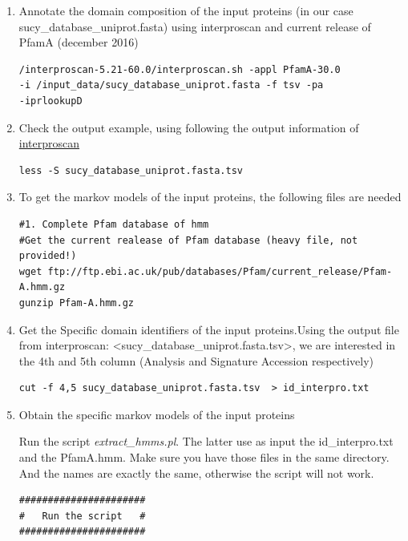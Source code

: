 \documentclass[12pt]{report}
\begin{document}
\begin{enumerate}
\item Annotate the domain composition of the input proteins (in our case sucy\_database\_uniprot.fasta) using interproscan and current release of PfamA  (december 2016) 

\begin{verbatim}
/interproscan-5.21-60.0/interproscan.sh -appl PfamA-30.0 
-i /input_data/sucy_database_uniprot.fasta -f tsv -pa 
-iprlookupD
\end{verbatim}

\item  Check the output example, using  following the output information of  \href{https://github.com/ebi-pf-team/interproscan/wiki/InterProScan5OutputFormats}{interproscan}

\begin{verbatim}
less -S sucy_database_uniprot.fasta.tsv
\end{verbatim}

\item To get the markov models of the input  proteins, the following files are needed

\begin{verbatim}
#1. Complete Pfam database of hmm 
#Get the current realease of Pfam database (heavy file, not provided!)
wget ftp://ftp.ebi.ac.uk/pub/databases/Pfam/current_release/Pfam-A.hmm.gz
gunzip Pfam-A.hmm.gz

\end{verbatim}

\item Get the Specific domain identifiers of the input proteins.Using the output file from interproscan: 
<sucy\_database\_uniprot.fasta.tsv>,  we are interested in the 4th and 5th column (Analysis and Signature Accession respectively) 

\begin{verbatim}
cut -f 4,5 sucy_database_uniprot.fasta.tsv  > id_interpro.txt 
\end{verbatim}

\item Obtain the specific markov models of the input proteins 

Run the script \textit{extract\_hmms.pl}. 
The latter use as input the  id\_interpro.txt  and the  PfamA.hmm. Make sure you have those files in the same directory. And the names are exactly the same, otherwise the script will not work.

\begin{verbatim}
######################
#   Run the script   #
######################


\end{verbatim}
\end{enumerate}
\end{document}
